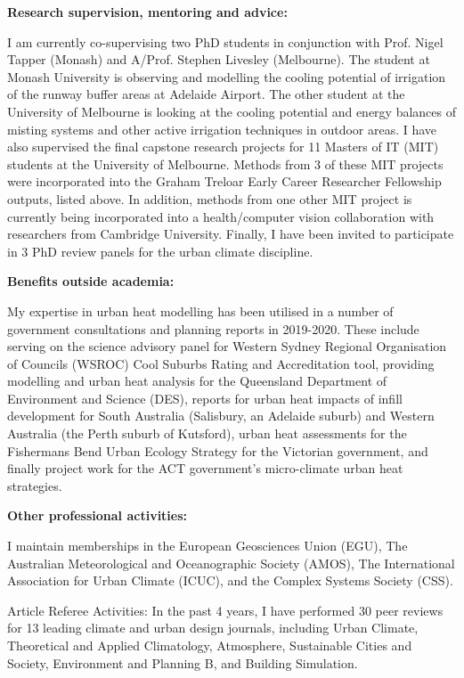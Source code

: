 \textbf{Research supervision, mentoring and advice:}

I am currently co-supervising two PhD students in conjunction with Prof. Nigel Tapper (Monash) and A/Prof. Stephen Livesley (Melbourne). The student at Monash University is observing and modelling the cooling potential of irrigation of the runway buffer areas at Adelaide Airport. The other student at the University of Melbourne is looking at the cooling potential and energy balances of misting systems and other active irrigation techniques in outdoor areas. I have also supervised the final capstone research projects for 11 Masters of IT (MIT) students at the University of Melbourne. Methods from 3 of these MIT projects were incorporated into the Graham Treloar Early Career Researcher Fellowship outputs, listed above. In addition, methods from one other MIT project is currently being incorporated into a health/computer vision collaboration with researchers from Cambridge University. Finally, I have been invited to participate in 3 PhD review panels for the urban climate discipline.



\textbf{Benefits outside academia:}

My expertise in urban heat modelling has been utilised in a number of government consultations and planning reports in 2019-2020. These include serving on the science advisory panel for Western Sydney Regional Organisation of Councils (WSROC) Cool Suburbs Rating and Accreditation tool, providing modelling and urban heat analysis for the Queensland Department of Environment and Science (DES), reports for urban heat impacts of infill development for South Australia (Salisbury, an Adelaide suburb) and Western Australia (the Perth suburb of Kutsford), urban heat assessments for the Fishermans Bend Urban Ecology Strategy for the Victorian government, and finally project work for the ACT government's micro-climate urban heat strategies.



\textbf{Other professional activities:}

I maintain memberships in the European Geosciences Union (EGU), The Australian Meteorological and Oceanographic Society (AMOS), The International Association for Urban Climate (ICUC), and the Complex Systems Society (CSS).

Article Referee Activities: In the past 4 years, I have performed 30 peer reviews for 13 leading climate and urban design journals, including Urban Climate, Theoretical and Applied Climatology, Atmosphere, Sustainable Cities and Society, Environment and Planning B, and Building Simulation.




%
